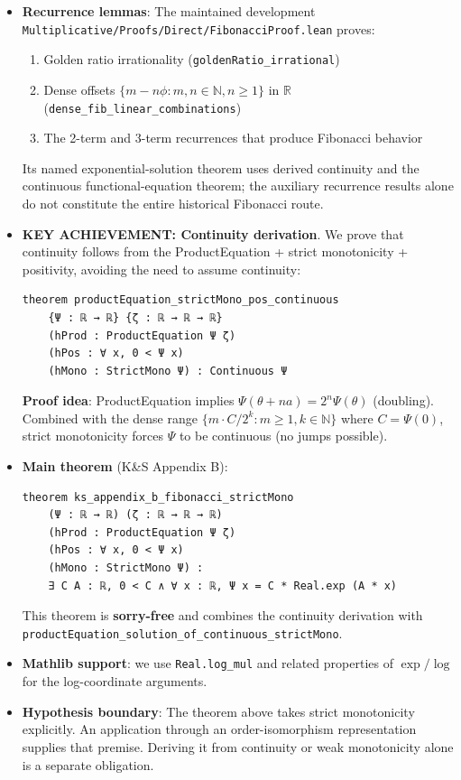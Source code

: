 \documentclass[11pt]{article}
\theoremstyle{definition}
\theoremstyle{remark}
\begin{document}
\begin{itemize}
\item \textbf{Recurrence lemmas}: The maintained development
  \texttt{Multiplicative/Proofs/Direct/FibonacciProof.lean} proves:
  \begin{enumerate}
  \item Golden ratio irrationality (\texttt{goldenRatio\_irrational})
  \item Dense offsets $\{m - n\phi : m,n \in \mathbb{N}, n \geq 1\}$ in $\mathbb{R}$ (\texttt{dense\_fib\_linear\_combinations})
  \item The 2-term and 3-term recurrences that produce Fibonacci behavior
  \end{enumerate}
  Its named exponential-solution theorem uses derived continuity and the
  continuous functional-equation theorem; the auxiliary recurrence results
  alone do not constitute the entire historical Fibonacci route.

\item \textbf{KEY ACHIEVEMENT: Continuity derivation}.  We prove that continuity follows from
  the ProductEquation + strict monotonicity + positivity, avoiding the need to assume continuity:
  \begin{lstlisting}[caption={Deriving continuity from ProductEquation}]
theorem productEquation_strictMono_pos_continuous
    {Ψ : ℝ → ℝ} {ζ : ℝ → ℝ → ℝ}
    (hProd : ProductEquation Ψ ζ)
    (hPos : ∀ x, 0 < Ψ x)
    (hMono : StrictMono Ψ) : Continuous Ψ
  \end{lstlisting}
  \textbf{Proof idea}: ProductEquation implies $\Psi(\theta + na) = 2^n \Psi(\theta)$ (doubling).
  Combined with the dense range $\{m \cdot C/2^k : m \geq 1, k \in \mathbb{N}\}$ where $C = \Psi(0)$,
  strict monotonicity forces $\Psi$ to be continuous (no jumps possible).

\item \textbf{Main theorem} (K\&S Appendix B):
  \begin{lstlisting}[caption={K\&S Appendix B: StrictMono case}]
theorem ks_appendix_b_fibonacci_strictMono
    (Ψ : ℝ → ℝ) (ζ : ℝ → ℝ → ℝ)
    (hProd : ProductEquation Ψ ζ)
    (hPos : ∀ x, 0 < Ψ x)
    (hMono : StrictMono Ψ) :
    ∃ C A : ℝ, 0 < C ∧ ∀ x : ℝ, Ψ x = C * Real.exp (A * x)
  \end{lstlisting}
  This theorem is \textbf{sorry-free} and combines the continuity derivation with
  \texttt{productEquation\_solution\_of\_continuous\_strictMono}.

\item \textbf{Mathlib support}: we use \texttt{Real.log\_mul} and related properties of $\exp/\log$ for the
  log-coordinate arguments.

\item \textbf{Hypothesis boundary}: The theorem above takes strict monotonicity
  explicitly. An application through an order-isomorphism representation supplies
  that premise. Deriving it from continuity or weak monotonicity alone is a
  separate obligation.
\end{itemize}
\end{document}
